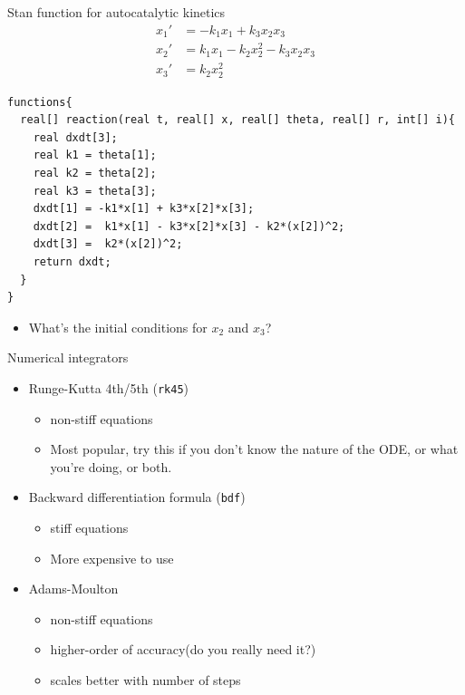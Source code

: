 \documentclass[presentation, allowframebreaks]{beamer}
\begin{document}
\begin{frame}[fragile,label={sec:orge464941}]{Stan function for autocatalytic kinetics}
 \begin{align*}
x_1' &= -k_1x_1 + k_3x_2x_3\\
x_2' &=  k_1x_1 - k_2x_2^2 - k_3x_2x_3\\
x_3' &=  k_2x_2^2
\end{align*}

\begin{verbatim}
functions{
  real[] reaction(real t, real[] x, real[] theta, real[] r, int[] i){
    real dxdt[3];
    real k1 = theta[1];
    real k2 = theta[2];
    real k3 = theta[3];
    dxdt[1] = -k1*x[1] + k3*x[2]*x[3];
    dxdt[2] =  k1*x[1] - k3*x[2]*x[3] - k2*(x[2])^2;
    dxdt[3] =  k2*(x[2])^2;
    return dxdt;
  }
}
\end{verbatim}
\begin{itemize}
\item What's the initial conditions for \(x_2\) and \(x_3\)?
\end{itemize}
\end{frame}

\begin{frame}[fragile,label={sec:org84f9f5f}]{Numerical integrators}
 \begin{itemize}
\item Runge-Kutta 4th/5th (\texttt{rk45})
\begin{itemize}
\item non-stiff equations
\item Most popular, try this if you don't know the nature of the ODE, or what you're doing, or both.
\end{itemize}
\item Backward differentiation formula (\texttt{bdf})
\begin{itemize}
\item stiff equations
\item More expensive to use
\end{itemize}
\item Adams-Moulton
\begin{itemize}
\item non-stiff equations
\item higher-order of accuracy(do you really need it?)
\item scales better with number of steps
\end{itemize}
\end{itemize}
\end{frame}
\end{document}
